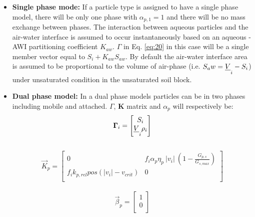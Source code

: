 \begin{itemize}
    \item \textbf{Single phase mode: } If a particle type is assigned to have a single phase model, there will be only one phase with $\alpha_{p,1}=1$ and there will be no mass exchange between phases. The interaction between aqueous particles and the air-water interface is assumed to occur instantaneously based on an aqueous -AWI partitioning coefficient $K_{aw}$. $\Gamma$ in Eq. \ref{eq:20} in this case will be a single member vector equal to $S_i + K_{aw} S_{aw}$. By default the air-water interface area is assumed to be proportional to the volume of air-phase (i.e. $S_aw = \sout{V}_i - S_i$) under unsaturated condition in the unsaturated soil block.  
    \item \textbf{Dual phase model: } In a dual phase models particles can be in two phases including mobile and attached. $\Gamma$, $\textbf{K}$ matrix and $\alpha_p$ will respectively be: 
    \begin{equation}
    \label{eq:21}
    \vec{\Gamma}_i = 
    \begin{bmatrix} 
    S_i \\ 
    \sout{V}_i \rho_i 
    \end{bmatrix}
    \end{equation}
    \\
    \begin{equation}
    \label{eq:22}
    \vec{K}_p = 
    \begin{bmatrix} 
    0 & f_i \alpha_p \eta_p \  |v_i| \ (1-\frac{G_{p,s}}{G_{s,max}}) \\ 
    f_i k_{p,rel}  pos(|v_i|-v_{crit}) & 0\\
    \end{bmatrix}
    \end{equation}
    \\
    \begin{equation}
    \label{eq:23}
    \vec{\beta}_p = 
    \begin{bmatrix} 
    1 \\ 
    0 \\
    \end{bmatrix}
    \end{equation}
    

\end{itemize}
